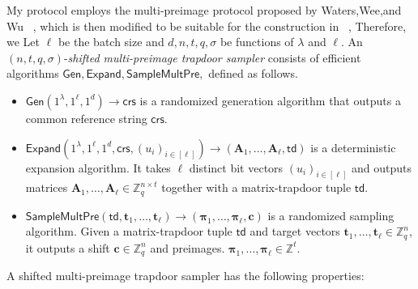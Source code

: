 My protocol employs  the multi-preimage protocol proposed by Waters,Wee,and Wu ~\cite{EC:WatWeeWu25}, which is then modified to be suitable for the construction in ~\cite{EPRINT:BonLauTas25}, Therefore, we 
\label{def:shifted-multi-preimage-sampler}
Let $\ell$ be the batch size and $d,n,t,q,\sigma$ be functions of
$\lambda$ and $\ell$. An
$(n,t,q,\sigma)$-\emph{shifted multi-preimage trapdoor sampler} consists of
efficient algorithms
$
    \mathsf{Gen},
    \mathsf{Expand},
    \mathsf{SampleMultPre},
$
defined as follows.
\begin{itemize}
    \item 
    $\mathsf{Gen}(1^\lambda,1^\ell,1^d)\to \mathsf{crs}$ is a randomized
    generation algorithm that outputs a common reference string $\mathsf{crs}$.

    \item
    $\mathsf{Expand}(1^\lambda,1^\ell,1^d,\mathsf{crs},(u_i)_{i\in[\ell]})
    \to (\mathbf A_1,\ldots,\mathbf A_\ell,\mathsf{td})$
    is a deterministic expansion algorithm. It takes $\ell$ distinct bit
    vectors $(u_i)_{i\in[\ell]}$ and outputs matrices
    $
        \mathbf A_1,\ldots,\mathbf A_\ell \in \mathbb Z_q^{n\times t}
    $
    together with a matrix-trapdoor tuple $\mathsf{td}$.

    \item
    $\mathsf{SampleMultPre}(\mathsf{td},\mathbf t_1,\ldots,\mathbf t_\ell)
    \to (\boldsymbol\pi_1,\ldots,\boldsymbol\pi_\ell,\mathbf c)$
    is a randomized sampling algorithm. Given a matrix-trapdoor tuple
    $\mathsf{td}$ and target vectors
    $\mathbf t_1,\ldots,\mathbf t_\ell\in\mathbb Z_q^n$, it outputs a shift
    $
        \mathbf c\in\mathbb Z_q^n
    $
    and preimages.
    $
        \boldsymbol\pi_1,\ldots,\boldsymbol\pi_\ell\in\mathbb Z^t .
    $
\end{itemize}
A shifted multi-preimage trapdoor sampler has the following properties:

